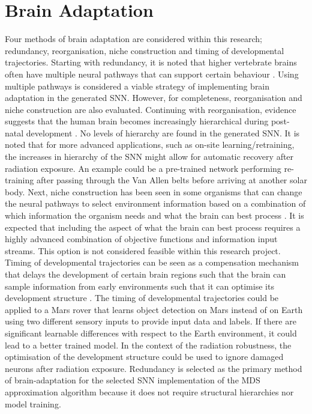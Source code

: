 \section{Brain Adaptation}\label{sec:brain_adaptation}
Four methods of brain adaptation are considered within this research; redundancy, reorganisation, niche construction and timing of developmental trajectories.  Starting with redundancy, it is noted that higher vertebrate brains often have multiple neural pathways that can support certain behaviour \cite{johnson_brain_2015}. Using multiple pathways is considered a viable strategy of implementing brain adaptation in the generated SNN. However, for completeness, reorganisation and niche construction are also evaluated. Continuing with reorganisation, evidence suggests that the human brain becomes increasingly hierarchical during post-natal development \cite{supekar_brain_2013}. No levels of hierarchy are found in the generated SNN. It is noted that for more advanced applications, such as on-site learning/retraining, the increases in hierarchy of the SNN might allow for automatic recovery after radiation exposure. An example could be a pre-trained network performing re-training after passing through the Van Allen belts before arriving at another solar body. Next, niche construction has been seen in some organisms that can change the neural pathways to select environment information based on a combination of which information the organism needs and what the brain can best process \cite{johnson_brain_2015}. It is expected that including the aspect of what the brain can best process requires a highly advanced combination of objective functions and information input streams. This option is not considered feasible within this research project. Timing of developmental trajectories can be seen as a compensation mechanism that delays the development of certain brain regions such that the brain can sample information from early environments such that it can optimise its development structure \cite{johnson_brain_2015}. The timing of developmental trajectories could be applied to a Mars rover that learns object detection on Mars instead of on Earth using two different sensory inputs to provide input data and labels. If there are significant learnable differences with respect to the Earth environment, it could lead to a better trained model. In the context of the radiation robustness, the optimisation of the development structure could be used to ignore damaged neurons after radiation exposure. Redundancy is selected as the primary method of brain-adaptation for the selected SNN implementation of the MDS approximation algorithm because it does not require structural hierarchies nor model training.

